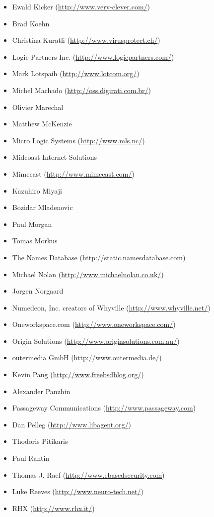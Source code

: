 \documentclass[a4paper,titlepage,12pt]{article}
\begin{document}
\begin{itemize}
	\item Ewald Kicker (\url{http://www.very-clever.com/})
	\item Brad Koehn
	\item Christina Kuratli (\url{http://www.virusprotect.ch/})
	\item Logic Partners Inc. (\url{http://www.logicpartners.com/})
	\item Mark Lotspaih (\url{http://www.lotcom.org/})
	\item Michel Machado (\url{http://oss.digirati.com.br/})
	\item Olivier Marechal
	\item Matthew McKenzie
	\item Micro Logic Systems (\url{http://www.mls.nc/})
	\item Midcoast Internet Solutions
	\item Mimecast (\url{http://www.mimecast.com/})
	\item Kazuhiro Miyaji
	\item Bozidar Mladenovic
	\item Paul Morgan
	\item Tomas Morkus
	\item The Names Database (\url{http://static.namesdatabase.com})
	\item Michael Nolan (\url{http://www.michaelnolan.co.uk/})
	\item Jorgen Norgaard
	\item Numedeon, Inc. creators of Whyville (\url{http://www.whyville.net/})
	\item Oneworkspace.com (\url{http://www.oneworkspace.com/})
	\item Origin Solutions (\url{http://www.originsolutions.com.au/})
	\item outermedia GmbH (\url{http://www.outermedia.de/})
	\item Kevin Pang (\url{http://www.freebsdblog.org/})
	\item Alexander Panzhin
	\item Passageway Communications (\url{http://www.passageway.com})
	\item Dan Pelleg (\url{http://www.libagent.org/})
	\item Thodoris Pitikaris
	\item Paul Rantin
	\item Thomas J. Raef (\url{http://www.ebasedsecurity.com})
	\item Luke Reeves (\url{http://www.neuro-tech.net/})
	\item RHX (\url{http://www.rhx.it/})

\end{itemize}
\end{document}
